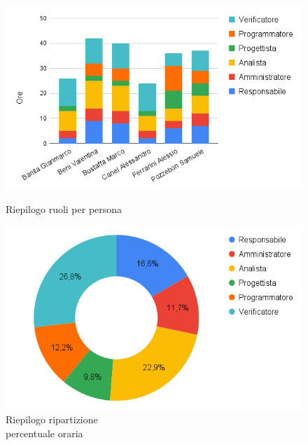 \begin{figure}[h!]
	\centering
	\begin{minipage}[c]{0.44\textwidth}
    	\includegraphics[scale=0.42]{../../assets/Diagrammi_Excel/person_tot.png}
		\caption{Riepilogo ruoli per persona}
	\end{minipage}
\hfill
	\begin{minipage}[c]{0.46\textwidth}
		\includegraphics[scale=0.38]{../../assets/Diagrammi_Excel/torta_tot.png}
		\caption{Riepilogo ripartizione\\ percentuale oraria}
	\end{minipage}
\end{figure}

\setlength\extrarowheight{0pt}



